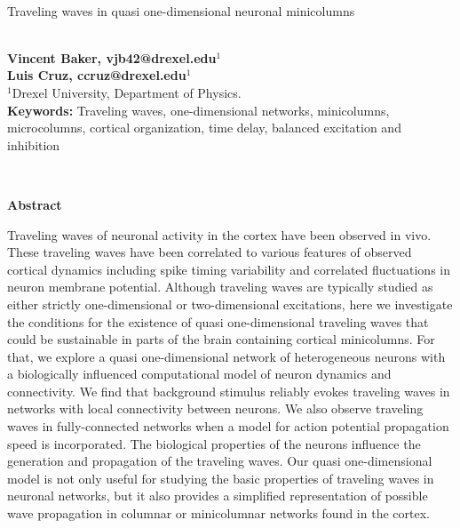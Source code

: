\documentclass[12pt]{article}
\begin{document}
\hspace{13.9cm}

\ \vspace{20mm}\\

{\LARGE Traveling waves in quasi one-dimensional neuronal minicolumns}

\ \\
{\bf \large Vincent Baker, vjb42@drexel.edu$^{\displaystyle 1}$}\\
{\bf \large Luis Cruz, ccruz@drexel.edu$^{\displaystyle 1}$}\\
{$^{\displaystyle 1}$Drexel University, Department of Physics.}\\
%

{\bf Keywords:} Traveling waves, one-dimensional networks, minicolumns, microcolumns, cortical organization, time delay, balanced excitation and inhibition

\thispagestyle{empty}
%
\ \vspace{-0mm}\\
%
\begin{center} {\bf Abstract} \end{center}
Traveling waves of neuronal activity in the cortex have been observed in vivo.
These traveling waves have been correlated to various features of observed cortical dynamics including spike timing variability and correlated fluctuations in neuron membrane potential.
Although traveling waves are typically studied as \color{red}either strictly one-dimensional or \color{black}two-dimensional excitations, here we investigate the conditions for the existence of \color{red}quasi \color{black} one-dimensional traveling waves that could be sustainable in parts of the brain containing cortical minicolumns.
For that, we explore a \color{red}quasi \color{black} one-dimensional network of \color{red}heterogeneous \color{black}neurons with a biologically influenced computational model of neuron dynamics and connectivity.
We find that background stimulus reliably evokes traveling waves in networks with local connectivity between neurons.
We also observe traveling waves in fully-connected networks when a model for action potential propagation speed is incorporated.
The biological properties of the neurons influence the generation and propagation of the traveling waves. 
Our \color{red}quasi \color{black} one-dimensional model is not only useful for studying the basic properties of traveling waves in neuronal networks, but it also provides a simplified representation of possible wave propagation in columnar or minicolumnar networks found in the cortex.
\end{document}
